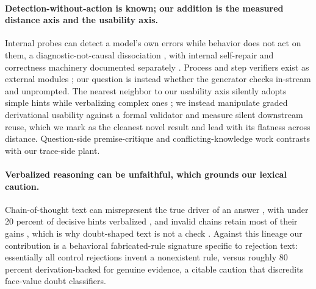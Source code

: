 \paragraph{Detection-without-action is known; our addition is the measured
distance axis and the usability axis.} Internal probes can detect a model's
own errors while behavior does not act on them, a diagnostic-not-causal
dissociation \citep{yuan2026hidden, yee2024dissociation}, with internal
self-repair and correctness machinery documented separately
\citep{mcgrath2023hydra, lad2024stages, sun2026trajectories}. Process and
step verifiers exist as external modules \citep{lightman2024verify,
zheng2025processbench, you2025probabilistic}; our question is instead whether
the generator checks in-stream and unprompted. The nearest neighbor to our
usability axis silently adopts simple hints while verbalizing complex ones
\citep{chen2025reasoning}; we
instead manipulate graded derivational
usability against a formal validator and measure silent downstream reuse,
which we mark as the cleanest novel result and lead with its flatness across
distance. Question-side premise-critique and conflicting-knowledge work
\citep{li2025pcbench, feng2026track, feng2025misinformation} contrasts with
our trace-side plant.

\paragraph{Verbalized reasoning can be unfaithful, which grounds our lexical
caution.} Chain-of-thought text can misrepresent the true driver of an
answer \citep{turpin2023unfaithful, lanham2023measuring, arcuschin2026wild},
with under 20 percent of decisive hints verbalized \citep{chen2025reasoning},
and invalid chains retain most of their gains \citep{schaeffer2023invalid,
wang2023understanding}, which is why doubt-shaped text is not a check
\citep{kambhampati2026position}. Against this lineage our contribution is a
behavioral fabricated-rule signature specific to rejection text: essentially
all control rejections invent a nonexistent rule, versus roughly 80 percent
derivation-backed for genuine evidence, a citable caution that discredits
face-value doubt classifiers.


